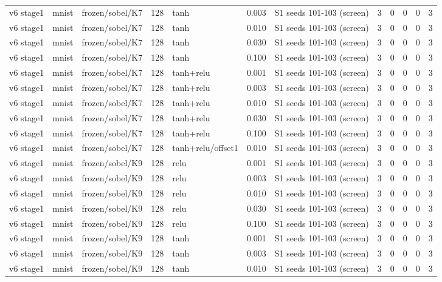 \begin{table}[htbp]
{\begin{tabular}{@{}lllrlrlrrrrr@{}}
v6 stage1 & mnist & frozen/sobel/K7 & 128 & tanh & 0.003 & S1 seeds 101-103 (screen) & 3 & 0 & 0 & 0 & 3 \\
v6 stage1 & mnist & frozen/sobel/K7 & 128 & tanh & 0.010 & S1 seeds 101-103 (screen) & 3 & 0 & 0 & 0 & 3 \\
v6 stage1 & mnist & frozen/sobel/K7 & 128 & tanh & 0.030 & S1 seeds 101-103 (screen) & 3 & 0 & 0 & 0 & 3 \\
v6 stage1 & mnist & frozen/sobel/K7 & 128 & tanh & 0.100 & S1 seeds 101-103 (screen) & 3 & 0 & 0 & 0 & 3 \\
v6 stage1 & mnist & frozen/sobel/K7 & 128 & tanh+relu & 0.001 & S1 seeds 101-103 (screen) & 3 & 0 & 0 & 0 & 3 \\
v6 stage1 & mnist & frozen/sobel/K7 & 128 & tanh+relu & 0.003 & S1 seeds 101-103 (screen) & 3 & 0 & 0 & 0 & 3 \\
v6 stage1 & mnist & frozen/sobel/K7 & 128 & tanh+relu & 0.010 & S1 seeds 101-103 (screen) & 3 & 0 & 0 & 0 & 3 \\
v6 stage1 & mnist & frozen/sobel/K7 & 128 & tanh+relu & 0.030 & S1 seeds 101-103 (screen) & 3 & 0 & 0 & 0 & 3 \\
v6 stage1 & mnist & frozen/sobel/K7 & 128 & tanh+relu & 0.100 & S1 seeds 101-103 (screen) & 3 & 0 & 0 & 0 & 3 \\
v6 stage1 & mnist & frozen/sobel/K7 & 128 & tanh+relu/offset1 & 0.010 & S1 seeds 101-103 (screen) & 3 & 0 & 0 & 0 & 3 \\
v6 stage1 & mnist & frozen/sobel/K9 & 128 & relu & 0.001 & S1 seeds 101-103 (screen) & 3 & 0 & 0 & 0 & 3 \\
v6 stage1 & mnist & frozen/sobel/K9 & 128 & relu & 0.003 & S1 seeds 101-103 (screen) & 3 & 0 & 0 & 0 & 3 \\
v6 stage1 & mnist & frozen/sobel/K9 & 128 & relu & 0.010 & S1 seeds 101-103 (screen) & 3 & 0 & 0 & 0 & 3 \\
v6 stage1 & mnist & frozen/sobel/K9 & 128 & relu & 0.030 & S1 seeds 101-103 (screen) & 3 & 0 & 0 & 0 & 3 \\
v6 stage1 & mnist & frozen/sobel/K9 & 128 & relu & 0.100 & S1 seeds 101-103 (screen) & 3 & 0 & 0 & 0 & 3 \\
v6 stage1 & mnist & frozen/sobel/K9 & 128 & tanh & 0.001 & S1 seeds 101-103 (screen) & 3 & 0 & 0 & 0 & 3 \\
v6 stage1 & mnist & frozen/sobel/K9 & 128 & tanh & 0.003 & S1 seeds 101-103 (screen) & 3 & 0 & 0 & 0 & 3 \\
v6 stage1 & mnist & frozen/sobel/K9 & 128 & tanh & 0.010 & S1 seeds 101-103 (screen) & 3 & 0 & 0 & 0 & 3 \\

\end{tabular}}
\end{table}

